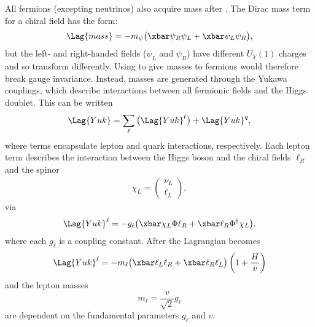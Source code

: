 All fermions (excepting neutrinos) also acquire mass after \SSB.
The Dirac mass term for a chiral field has the form:
\begin{equation}
  \Lag{mass} = -m_\psi\big(\xbar\psi_R\psi_L + \xbar\psi_L\psi_R\big),
  \label{eq:diracmass}
\end{equation}
but the left- and right-handed fields
($\psi_L$ and $\psi_R$) have different $U_Y(1)$ charges and so transform differently.
Using  to give masses to fermions would therefore break gauge invariance.
Instead, masses are generated through the Yukawa couplings, which
describe interactions between all fermionic fields and the Higgs doublet.
This can be written
\begin{equation}
  \Lag{Yuk} = \sum_{\ell}\big(\Lag{Yuk}^\ell\big) + \Lag{Yuk}^q,
  \label{eq:th:yukking}
\end{equation}
where terms encapsulate lepton and quark interactions, respectively.
Each lepton term describes the interaction between the Higgs boson and the chiral fields
$\ell_R$ and the spinor
\begin{align}
  \chi_L = \begin{pmatrix}\nu_L \\ \ell_L \end{pmatrix},
\end{align}
via
\begin{equation}
  \Lag{Yuk}^\ell
  = - g_\ell\big(\xbar\chi_L\Phi \ell_R + \xbar \ell_R\Phi^\dagger\chi_L\big),
\end{equation}
where each $g_\ell$ is a coupling constant.
After \SSB the Lagrangian becomes
\begin{align}
  \Lag{Yuk}^\ell
  = - m_\ell \big(\xbar\ell_L\ell_R + \xbar\ell_R\ell_L\big)%
  \left(1 + \frac{H}{v}\right)
\end{align}
and the lepton masses
\begin{equation}
  m_\ell = \frac{v}{\sqrt{2}}g_\ell
  \label{eq:leptonmass}
\end{equation}
are dependent on the fundamental parameters $g_\ell$ and $v$.

